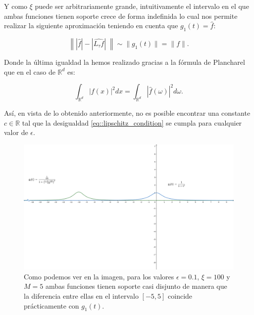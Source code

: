   \noindent Y como $\xi$ puede ser arbitrariamente grande, intuitivamente el intervalo en el que ambas funciones tienen soporte  crece de forma indefinida lo cual nos permite realizar la siguiente aproximación teniendo en cuenta que $g_1(t)=\widehat{f}$:

  \begin{equation} \label{eq::1.1}
    \left\| |\widehat{f}| -|\widehat{L_\tau f}| \; \right\| \sim \|g_1(t) \|=\|f\|. 
  \end{equation}

  \noindent Donde la última igualdad la hemos realizado gracias a la fórmula de Plancharel que en el caso de $\mathbb{R}^d$ es: 

  \begin{equation} \label{eq::Plancharel}
    \int_{\mathbb{R}^d} \left|f(x)\right|^2 dx= \int_{\mathbb{R}^d}\left|\widehat{f}(\omega)\right|^2 d\omega.
  \end{equation}

  \noindent Así, en vista de lo obtenido anteriormente, no es posible encontrar una constante $c \in \mathbb{R}$ tal que la desigualdad \eqref{eq::lipschitz_condition} se cumpla para cualquier valor de $\epsilon$.

  \begin{figure}[!h]
    \centering
    \includegraphics[width=1.0\textwidth]{img/geogebra-export_contraejemplo_Fourier.png}
    \caption{Como podemos ver en la imagen, para los valores $\epsilon=0.1$, $\xi=100$ y $M=5$ ambas funciones tienen soporte casi disjunto de manera que la diferencia entre ellas en el intervalo $[-5,5]$ coincide prácticamente con $g_1(t)$.}
    \label{fig:Grafica_funciones}
  \end{figure}


